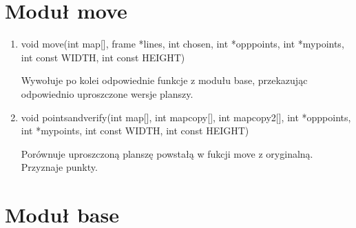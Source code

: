 \documentclass{article}
\begin{document}
\section{Moduł move}

\begin{enumerate}

\item void move(int map[], frame *lines, int chosen, int *opp\textunderscore points, int *my\textunderscore points, int const WIDTH, int const HEIGHT)

Wywołuje po kolei odpowiednie funkcje z modułu base, przekazując odpowiednio uproszczone wersje planszy.

\item void pointsandverify(int map[], int mapcopy[], int mapcopy2[], int *opp\textunderscore points, int *my\textunderscore points, int const WIDTH, int const HEIGHT)

Porównuje uproszczoną planszę powstałą w fukcji move z oryginalną. Przyznaje punkty.

\end{enumerate}

\section{Moduł base}
\end{document}

